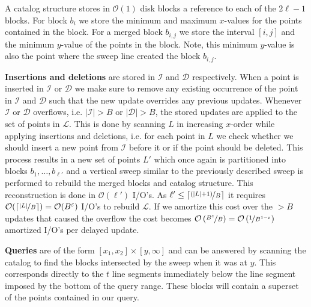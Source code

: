 \documentclass[twoside,11pt,openright]{report}
\def \epsilon {\varepsilon}
\begin{document}
A catalog structure stores in $\mathcal{O}(1)$ disk blocks a reference to each of the $2\ell-1$ blocks. For block $b_i$ we store the minimum and maximum $x$-values for the points contained in the block. For a merged block $b_{i,j}$ we store the interval $\left[ i,j\right]$ and the minimum $y$-value of the points in the block. Note, this minimum $y$-value is also the point where the sweep line created the block $b_{i,j}$.

\textbf{Insertions and deletions} are stored in $\mathcal{I}$ and $\mathcal{D}$ respectively. When a point is inserted in $\mathcal{I}$ or $\mathcal{D}$ we make sure to remove any existing occurrence of the point in $\mathcal{I}$ and $\mathcal{D}$ such that the new update overrides any previous updates. Whenever $\mathcal{I}$ or $\mathcal{D}$ overflows, i.e. $\vert \mathcal{I} \vert > B$ or $\vert \mathcal{D} \vert > B$, the stored updates are applied to the set of points in $\mathcal{L}$. This is done by scanning $L$ in increasing $x$-order while applying insertions and deletions, i.e. for each point in $L$ we check whether we should insert a new point from $\mathcal{I}$ before it or if the point should be deleted. This process results in a new set of points $L'$ which once again is partitioned into blocks $b_1,\dots,b_{\ell'}$ and a vertical sweep similar to the previously described sweep is performed to rebuild the merged blocks and catalog structure.
This reconstruction is done in $\mathcal{O}(\ell')$ I/O's. As $\ell' \leq \lceil \nicefrac{(\vert L \vert + 1)}{B}\rceil$ it requires $\mathcal{O}(\lceil \nicefrac{\vert L \vert}{B}\rceil) = \mathcal{O}(B^\epsilon)$ I/O's to rebuild $\mathcal{L}$. If we amortize this cost over the $>B$ updates that caused the overflow the cost becomes $\mathcal{O}\left(\nicefrac{B^\epsilon}{B}\right) = \mathcal{O}\left(\nicefrac{1}{B^{1-\epsilon}}\right)$ amortized I/O's per delayed update.

\textbf{Queries} are of the form $[x_1,x_2] \times [y,\infty]$ and can be answered by scanning the catalog to find the blocks intersected by the sweep when it was at $y$. This corresponds directly to the $t$ line segments immediately below the line segment imposed by the bottom of the query range. These blocks will contain a superset of the points contained in our query.
\end{document}
